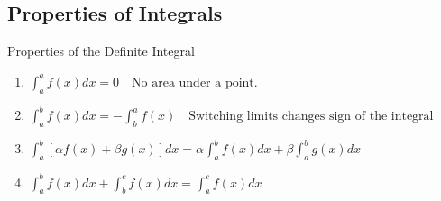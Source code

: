 \documentclass[]{beamer}
\begin{document}
\subsection{Properties of Integrals}
    \begin{frame}{Properties of the Definite Integral}
        \begin{enumerate}
            \item<2-> $\int_a^a f(x) dx = 0 \quad \text{No area under a point.}$
            \item<3-> $\int_a^b f(x) dx = -\int_b^a f(x) \quad \text{Switching limits changes sign of the integral}$
            \item<4-> $\int_a^b [\alpha f(x) + \beta g(x)] dx = \alpha \int_a^b f(x) dx + \beta \int_a^b g(x) dx$
            \item<5-> $\int_a^b f(x) dx + \int_b^c f(x) dx = \int_a^c f(x) dx$
        \end{enumerate}
    \end{frame}
\end{document}
